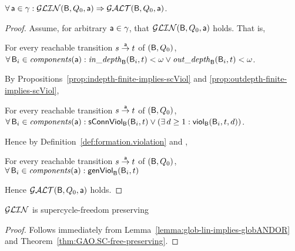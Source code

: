 





\begin{lemma} \label{lemma:glob-lin-implies-globANDOR} \label{GLinGAO}
$\fa \act \in \gamma: \GLin(\B, Q_0, \act) \imp \GAO(\B, Q_0, \act)$.  
\end{lemma}
%
\begin{proof}
Assume, for arbitrary $\act \in \gamma$, that $\GLin(\B, Q_0, \act)$ holds. That is, 
 
\ind For every reachable transition $s \goesto[\act] t$ of $(\B, Q_0)$,\\
\ind \ind  $\fas \B_i \in \cmps{\act}: \widepth{\B}{\B_i}{t} < \omega \lor \wodepth{\B}{\B_i}{t} < \omega$.

\noindent
By Propositions~\ref{prop:indepth-finite-implies-scViol} and \ref{prop:outdepth-finite-implies-scViol}, 

\ind For every reachable transition $s \goesto[\act] t$ of $(\B, Q_0)$,\\
\ind \ind  $\fas \B_i \in \cmps{\act}:  \connViol{\B_i}{t} \lor (\ex d \ge 1: \viol{\B_i}{d}{t})$.

\noindent
Hence by Definition~\ref{def:formation.violation}
and , 

\ind For every reachable transition $s \goesto[\act] t$ of $(\B, Q_0)$,\\
\ind \ind  $\fas \B_i \in \cmps{\act} : \formViol{\B_i}{t}$

\noindent
Hence $\GAO(\B, Q_0, \act)$ holds.
\end{proof}


\begin{theorem} \label{thm:GLin.SC-free-preserving}
$\GLin$ is supercycle-freedom preserving
\end{theorem}
%
\begin{proof}
Follows immediately from Lemma~\ref{lemma:glob-lin-implies-globANDOR} and Theorem~\ref{thm:GAO.SC-free-preserving}.
\end{proof}


